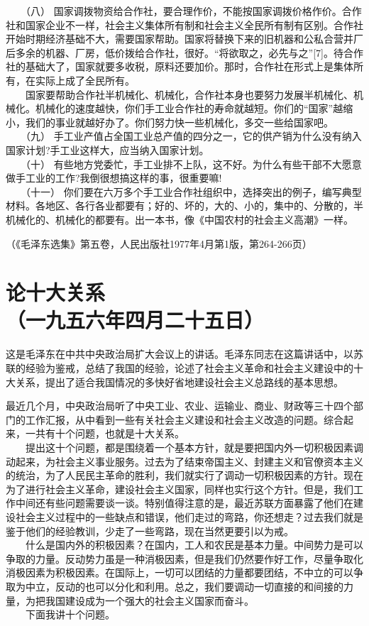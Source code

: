 \documentclass[cn,11pt,chinese]{elegantbook}
\def\myformat#1{\hfil\hfil #1}
\begin{document}
　　（八） 国家调拨物资给合作社，要合理作价，不能按国家调拨价格作价。合作社和国家企业不一样，社会主义集体所有制和社会主义全民所有制有区别。合作社开始时期经济基础不大，需要国家帮助。国家将替换下来的旧机器和公私合营并厂后多余的机器、厂房，低价拨给合作社，很好。“将欲取之，必先与之”[7]。待合作社的基础大了，国家就要多收税，原料还要加价。那时，合作社在形式上是集体所有，在实际上成了全民所有。\\
　　国家要帮助合作社半机械化、机械化，合作社本身也要努力发展半机械化、机械化。机械化的速度越快，你们手工业合作社的寿命就越短。你们的“国家”越缩小，我们的事业就越好办了。你们努力快一些机械化，多交一些给国家吧。\\
　　（九） 手工业产值占全国工业总产值的四分之一，它的供产销为什么没有纳入国家计划?手工业这样大，应当纳入国家计划。\\
　　（十） 有些地方党委忙，手工业排不上队，这不好。为什么有些干部不大愿意做手工业的工作?我倒很想搞这样的事，很重要嘛!\\
　　（十一） 你们要在六万多个手工业合作社组织中，选择突出的例子，编写典型材料。各地区、各行各业都要有；好的、坏的，大的、小的，集中的、分散的，半机械化的、机械化的都要有。出一本书，像《中国农村的社会主义高潮》一样。\\
\begin{flushright}（《毛泽东选集》第五卷，人民出版社1977年4月第1版，第264-266页）\end{flushright}
\newpage\section*{\myformat{论十大关系}\\\myformat{（一九五六年四月二十五日）}}
\begin{introduction}\item  这是毛泽东在中共中央政治局扩大会议上的讲话。毛泽东同志在这篇讲话中，以苏联的经验为鉴戒，总结了我国的经验，论述了社会主义革命和社会主义建设中的十大关系，提出了适合我国情况的多快好省地建设社会主义总路线的基本思想。\end{introduction}
最近几个月，中央政治局听了中央工业、农业、运输业、商业、财政等三十四个部门的工作汇报，从中看到一些有关社会主义建设和社会主义改造的问题。综合起来，一共有十个问题，也就是十大关系。\\
　　提出这十个问题，都是围绕着一个基本方针，就是要把国内外一切积极因素调动起来，为社会主义事业服务。过去为了结束帝国主义、封建主义和官僚资本主义的统治，为了人民民主革命的胜利，我们就实行了调动一切积极因素的方针。现在为了进行社会主义革命，建设社会主义国家，同样也实行这个方针。但是，我们工作中间还有些问题需要谈一谈。特别值得注意的是，最近苏联方面暴露了他们在建设社会主义过程中的一些缺点和错误，他们走过的弯路，你还想走？过去我们就是鉴于他们的经验教训，少走了一些弯路，现在当然更要引以为戒。\\
　　什么是国内外的积极因素？在国内，工人和农民是基本力量。中间势力是可以争取的力量。反动势力虽是一种消极因素，但是我们仍然要作好工作，尽量争取化消极因素为积极因素。在国际上，一切可以团结的力量都要团结，不中立的可以争取为中立，反动的也可以分化和利用。总之，我们要调动一切直接的和间接的力量，为把我国建设成为一个强大的社会主义国家而奋斗。\\
　　下面我讲十个问题。\\
\end{document}
